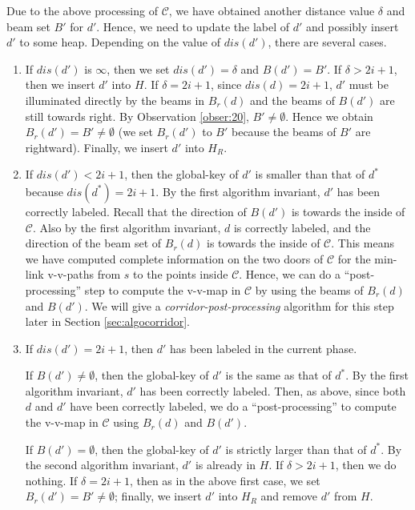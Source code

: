 \documentclass[english,runningheads,11pt]{llncs-revised}
\def\calC{\mathcal{C}}
\begin{document}
Due to the above processing of $\calC$, we have obtained another distance value $\delta$ and beam set $B'$ for $d'$. Hence, we need to update the label of $d'$ and possibly insert $d'$ to some heap.
Depending on the value of $dis(d')$, there are several cases.


\begin{enumerate}
\item
If $dis(d')$ is $\infty$, then we set $dis(d')=\delta$ and $B(d')=B'$.
If $\delta>2i+1$, then we insert $d'$ into $H$.
If $\delta=2i+1$, since $dis(d)=2i+1$, $d'$ must be
illuminated directly by the beams in $B_r(d)$ and the beams of $B(d')$ are still towards right.
By Observation \ref{obser:20}, $B'\neq\emptyset$.
Hence we obtain $B_r(d')=B'\neq\emptyset$ (we set $B_r(d')$ to $B'$
because the beams of $B'$ are rightward).  Finally, we insert $d'$ into $H_R$.

\item
If $dis(d')<2i+1$, then the global-key of $d'$ is smaller than that of $d^*$ because $dis(d^*)=2i+1$. By the first algorithm invariant, $d'$ has been
correctly labeled. Recall that the direction of $B(d')$ is towards the inside of $\calC$.
Also by the first algorithm invariant, $d$ is
correctly labeled, and the direction of the beam set of $B_r(d)$ is
towards the inside of $\calC$. This means we have computed complete information on the
two doors of $\calC$ for the min-link v-v-paths from $s$ to the points
inside $\calC$. Hence, we can do a ``post-processing'' step to
compute the v-v-map in $\calC$ by using the beams of $B_r(d)$ and
$B(d')$. We will give a {\em corridor-post-processing} algorithm for this step later in Section \ref{sec:algocorridor}.

\item
If $dis(d')=2i+1$, then $d'$ has been labeled in the current phase.

If $B(d')\neq \emptyset$, then the global-key of $d'$ is the same as that of $d^*$. By
the first algorithm invariant, $d'$ has been correctly labeled. Then, as
above, since both $d$ and $d'$ have been correctly
labeled, we do a ``post-processing'' to compute the
v-v-map in $\calC$ using $B_r(d)$ and $B(d')$.

If $B(d')= \emptyset$, then the global-key of $d'$ is strictly larger than that of
$d^*$. By the second algorithm invariant, $d'$ is already in $H$.
If $\delta>2i+1$, then we do nothing.
If $\delta=2i+1$, then as in the above first case, we set $B_r(d')=B'\neq\emptyset$;
finally, we insert $d'$ into $H_R$ and remove $d'$ from $H$.



\end{enumerate}
\end{document}
